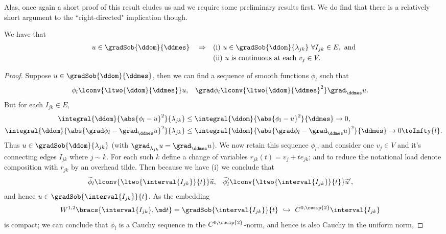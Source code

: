 Alas, once again a short proof of this result eludes us and we require some preliminary results first.
We do find that there is a relatively short argument to the ``right-directed" implication though.
\begin{prop} \label{prop:CharGradSobRightImplies}
	We have that
	\begin{align*}
		u\in\gradSob{\ddom}{\ddmes} \quad \Rightarrow 
		&\quad\text{(i)} \ u\in\gradSob{\ddom}{\lambda_{jk}} \ \forall I_{jk}\in E, \text{ and}\\
		&\quad\text{(ii)} \ u \text{ is continuous at each } v_j\in V.
	\end{align*}
\end{prop}
\begin{proof}
	Suppose $u\in\gradSob{\ddom}{\ddmes}$, then we can find a sequence of smooth functions $\phi_l$ such that
	\begin{align*}
		\phi_l \lconv{\ltwo{\ddom}{\ddmes}} u, 
		&\quad \grad\phi_l \lconv{\ltwo{\ddom}{\ddmes}^2} \grad_\ddmes u.
	\end{align*}
	But for each $I_{jk}\in E$,
	\begin{align*}
		\integral{\ddom}{\abs{ \phi_l - u }^2}{\lambda_{jk}}
		&\leq \integral{\ddom}{\abs{ \phi_l - u }^2}{\ddmes} \rightarrow 0, \\
		\integral{\ddom}{\abs{ \grad\phi_l - \grad_\ddmes u }^2}{\lambda_{jk}}
		&\leq \integral{\ddom}{\abs{ \grad\phi_l - \grad_\ddmes u }^2}{\ddmes} \rightarrow 0 \toInfty{l}.
	\end{align*}
	Thus $u\in\gradSob{\ddom}{\lambda_{jk}}$ (with $\grad_{\lambda_{jk}}u = \grad_\ddmes u$).
	We now retain this sequence $\phi_l$, and consider one $v_j\in V$ and it's connecting edges $I_{jk}$ where $j\sim k$.
	For each such $k$ define a change of variables $r_{jk}(t) = v_{j} + t e_{jk}$; and to reduce the notational load denote composition with $r_{jk}$ by an overhead tilde.
	Then because we have (i) we conclude that 
	\begin{align*}
		\widetilde{\phi}_l \lconv{\ltwo{\interval{I_{jk}}}{t}} \widetilde{u}, 
		&\quad \widetilde{\phi}'_l \lconv{\ltwo{\interval{I_{jk}}}{t}} \widetilde{u}',
	\end{align*}
	and hence $u\in\gradSob{\interval{I_{jk}}}{t}$.
	As the embedding 
	\begin{align*}
		W^{1,2}\bracs{\interval{I_{jk}}, \md t} = \gradSob{\interval{I_{jk}}}{t} \ &\hookrightarrow \ C^{0,\recip{2}}\interval{I_{jk}}
	\end{align*}
	is compact; we can conclude that $\phi_l$ is a Cauchy sequence in the $C^{0,\recip{2}}$-norm, and hence is also Cauchy in the uniform norm,

\end{proof}
